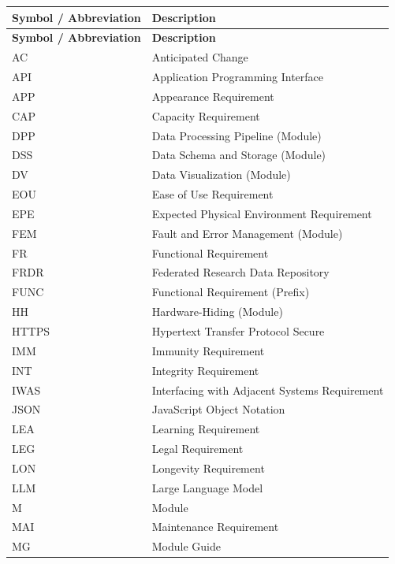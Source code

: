 \documentclass[12pt, titlepage]{article}
\begin{document}
\renewcommand{\arraystretch}{1.2}
\begin{longtable}{l l}
  \toprule
  \textbf{Symbol / Abbreviation} & \textbf{Description} \\
  \midrule
  \endfirsthead

  \toprule
  \textbf{Symbol / Abbreviation} & \textbf{Description} \\
  \midrule
  \endhead

  \bottomrule
  \endfoot

  \bottomrule
  \endlastfoot

  AC & Anticipated Change \\
  API & Application Programming Interface \\
  APP & Appearance Requirement \\
  CAP & Capacity Requirement \\
  DPP & Data Processing Pipeline (Module) \\
  DSS & Data Schema and Storage (Module) \\
  DV & Data Visualization (Module) \\
  EOU & Ease of Use Requirement \\
  EPE & Expected Physical Environment Requirement \\
  FEM & Fault and Error Management (Module) \\
  FR & Functional Requirement \\
  FRDR & Federated Research Data Repository \\
  FUNC & Functional Requirement (Prefix) \\
  HH & Hardware-Hiding (Module) \\
  HTTPS & Hypertext Transfer Protocol Secure \\
  IMM & Immunity Requirement \\
  INT & Integrity Requirement \\
  IWAS & Interfacing with Adjacent Systems Requirement \\
  JSON & JavaScript Object Notation \\
  LEA & Learning Requirement \\
  LEG & Legal Requirement \\
  LON & Longevity Requirement \\
  LLM & Large Language Model \\
  M & Module \\
  MAI & Maintenance Requirement \\
  MG & Module Guide \\

\end{longtable}
\end{document}
